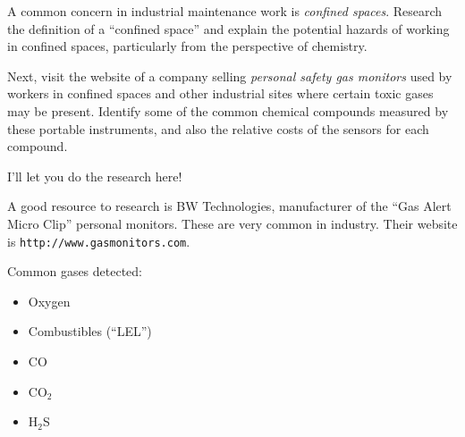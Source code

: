 

A common concern in industrial maintenance work is {\it confined spaces}.  Research the definition of a ``confined space'' and explain the potential hazards of working in confined spaces, particularly from the perspective of chemistry.

\vskip 10pt

Next, visit the website of a company selling {\it personal safety gas monitors} used by workers in confined spaces and other industrial sites where certain toxic gases may be present.  Identify some of the common chemical compounds measured by these portable instruments, and also the relative costs of the sensors for each compound.







I'll let you do the research here!







A good resource to research is BW Technologies, manufacturer of the ``Gas Alert Micro Clip'' personal monitors.  These are very common in industry.  Their website is {\tt http://www.gasmonitors.com}.

\vskip 10pt

Common gases detected:

\begin{itemize}
\item{} Oxygen
\item{} Combustibles (``LEL'')
\item{} CO
\item{} CO$_{2}$
\item{} H$_{2}$S
\end{itemize}




